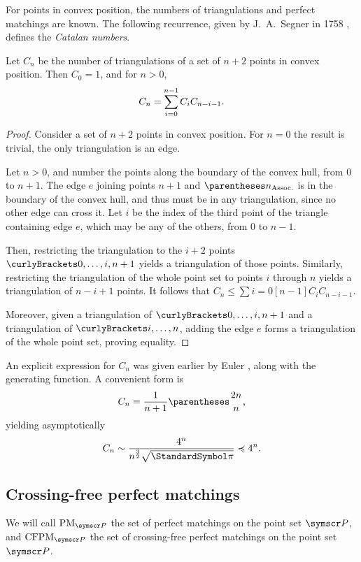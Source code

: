 \documentclass[10pt, a4paper, twoside]{basestyle}
\DeclareMathOperator{\PM}{PM}
\DeclareMathOperator{\CFPM}{CFPM}
\newcommand{\pointset}{\symscr}
\begin{document}
For points in convex position, the numbers of triangulations and perfect matchings are known.
The following recurrence, given by J.~A.~Segner in 1758 \cite{Segner1758}, defines the \emph{Catalan numbers}.
\begin{theorem}[Segner]
Let $C_n$ be the number of triangulations of a set of $n+2$ points in convex position.
Then $C_0 = 1$, and for $n>0$, \begin{equation}
C_n = \sum {i=0}[n-1] C_i C_{n-i-1}\text. \label{CatalanRecurrence}
\end{equation}
\begin{proof}
Consider a set of $n+2$ points in convex position.
For $n=0$ the result is trivial, the only triangulation is an edge.

Let $n > 0$, and number the points along the boundary of the convex hull, from $0$ to $n+1$.
The edge $e$ joining points $n+1$ and $\pa{n}$ is in the boundary of the convex hull, and thus must
be in any triangulation, since no other edge can cross it. Let $i$ be the index of the third point of the
triangle containing edge $e$, which may be any of the others, from $0$ to $n-1$.

Then, restricting the triangulation to the $i+2$ points $\set{0,\dotsc,i,n+1}$ yields a triangulation
of those points.
Similarly, restricting the triangulation of the whole point set to points $i$ through $n$ yields a triangulation of
$n-i+1$ points. It follows that $C_n \leq \sum {i=0}[n-1] C_i C_{n-i-1}$.

Moreover, given a triangulation of $\set{0,\dotsc,i,n+1}$ and a triangulation of $\set{i,\dotsc, n}$,
adding the edge $e$ forms a triangulation of the whole point set, proving equality.
\end{proof}
\end{theorem}
An explicit expression for $C_n$ was given earlier by Euler \cite{Euler1751}, along
with the generating function.
A convenient form is\begin{equation}
C_n = \frac{1}{n+1} \binom {2n} {n}\text,
\end{equation}
yielding asymptotically
\begin{equation}
C_n \sim \frac{4^n}{n^{\frac{3}{2}}\sqrt{\Pi}} \preccurlyeq 4^n\text.
\end{equation}

\subsection{Crossing-free perfect matchings}
\label{PerfectMatchingsIntro}
We will call $\PM_{\pointset P}$ the set of perfect matchings on the point set $\pointset P$,
and $\CFPM_{\pointset P}$ the set
of crossing-free perfect matchings on the point set $\pointset P$.
\end{document}
